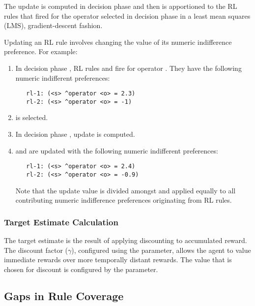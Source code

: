 The update is computed in decision phase  and then is apportioned to the RL rules that fired for the operator selected in decision phase  in a least mean squares (LMS), gradient-descent fashion.

Updating an RL rule involves changing the value of its numeric indifference preference.
For example:

\begin{enumerate}

\item In decision phase , RL rules  and  fire for operator .
	They have the following numeric indifferent preferences:
\begin{verbatim}
   rl-1: (<s> ^operator <o> = 2.3)
   rl-2: (<s> ^operator <o> = -1)
\end{verbatim}  

\item {} is selected.

\item In decision phase , update  is computed.

\item {} and  are updated with the following numeric indifferent preferences:
\begin{verbatim}
   rl-1: (<s> ^operator <o> = 2.4)
   rl-2: (<s> ^operator <o> = -0.9)
\end{verbatim}

Note that the update value is divided amongst and applied equally to all contributing numeric indifference preferences originating from RL rules.

\end{enumerate}

\subsubsection{Target Estimate Calculation}
The target estimate is the result of applying discounting to accumulated reward.
The discount factor ($\gamma$), configured using the  parameter, allows the agent to value immediate rewards over more temporally distant rewards.
The value that is chosen for discount is configured by the  parameter.

\subsection{Gaps in Rule Coverage}
\label{RL-gaps}


